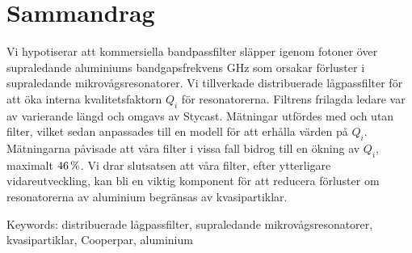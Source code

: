 \documentclass[../../main.tex]{subfiles}
\begin{document}
\section*{Sammandrag}
Vi hypotiserar att kommersiella bandpassfilter släpper igenom fotoner över supraledande aluminiums bandgapsfrekvens \unit[88]{GHz} som orsakar förluster i supraledande mikrovågsresonatorer. Vi tillverkade distribuerade lågpassfilter för att öka interna kvalitetsfaktorn $Q_i$ för resonatorerna. Filtrens frilagda ledare var av varierande längd och omgavs av Stycast. Mätningar utfördes med och utan filter, vilket sedan anpassades till en modell för att erhålla värden på $Q_i$. Mätningarna påvisade att våra filter i vissa fall bidrog till en ökning av $Q_i$, maximalt  $\unit[46]{\%}$. Vi drar slutsatsen att våra filter, efter ytterligare vidareutveckling, kan bli en viktig komponent för att reducera förluster om resonatorerna av aluminium begränsas av kvasipartiklar.

\vfill
Keywords: distribuerade lågpassfilter, supraledande mikrovågsresonatorer, kvasipartiklar, Cooperpar, aluminium

\newpage\null\thispagestyle{empty}\newpage
\end{document}

